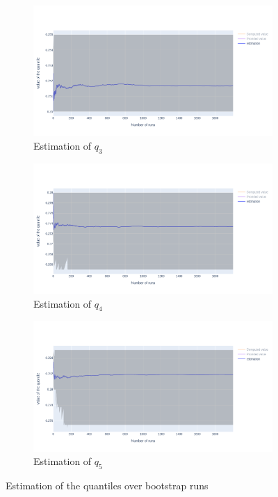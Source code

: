 \documentclass{article}
\begin{document}
\begin{figure}
    \centering
    \begin{subfigure}{.84\textwidth}
        \includegraphics[width=\textwidth]{images/estimation_q3.png}
        \caption{Estimation of $q_3$}
    \end{subfigure}
    \hfill
    \begin{subfigure}{.84\textwidth}
        \includegraphics[width=\textwidth]{images/estimation_q4.png}
        \caption{Estimation of $q_4$}
    \end{subfigure}
    \hfill
    \begin{subfigure}{.84\textwidth}
        \includegraphics[width=\textwidth]{images/estimation_q5.png}
        \caption{Estimation of $q_5$}
    \end{subfigure}
    \caption{Estimation of the quantiles over bootstrap runs}
    \label{fig: estimation of quantiles}
\end{figure}\
\end{document}
